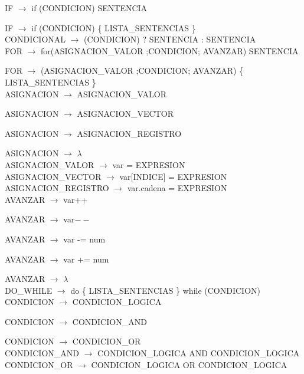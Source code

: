 \documentclass[10pt,a4paper]{article}
\begin{document}
IF $\rightarrow$ if (CONDICION) SENTENCIA   

IF $\rightarrow$ if (CONDICION) \{ LISTA\_SENTENCIAS \} \\

CONDICIONAL $\rightarrow$ (CONDICION) ? SENTENCIA : SENTENCIA \\

FOR $\rightarrow$ for(ASIGNACION\_VALOR ;CONDICION; AVANZAR) SENTENCIA  

FOR $\rightarrow$ (ASIGNACION\_VALOR ;CONDICION; AVANZAR) \{ LISTA\_SENTENCIAS \} \\

ASIGNACION $\rightarrow$ ASIGNACION\_VALOR   

ASIGNACION $\rightarrow$ ASIGNACION\_VECTOR  
 
ASIGNACION $\rightarrow$ ASIGNACION\_REGISTRO  

ASIGNACION $\rightarrow$ $\lambda$ \\

ASIGNACION\_VALOR $\rightarrow$ var = EXPRESION \\

ASIGNACION\_VECTOR $\rightarrow$ var[INDICE] = EXPRESION \\

ASIGNACION\_REGISTRO $\rightarrow$ var.cadena = EXPRESION \\

AVANZAR $\rightarrow$ var++   

AVANZAR $\rightarrow$ var$--$   

AVANZAR $\rightarrow$ var -= num   

AVANZAR $\rightarrow$ var += num  

AVANZAR $\rightarrow$ $\lambda$ \\

DO\_WHILE $\rightarrow$ do \{ LISTA\_SENTENCIAS \} while (CONDICION) \\

CONDICION $\rightarrow$ CONDICION\_LOGICA   

CONDICION $\rightarrow$ CONDICION\_AND   

CONDICION $\rightarrow$ CONDICION\_OR \\

CONDICION\_AND $\rightarrow$ CONDICION\_LOGICA AND CONDICION\_LOGICA \\

CONDICION\_OR $\rightarrow$ CONDICION\_LOGICA OR CONDICION\_LOGICA \\
\end{document}
